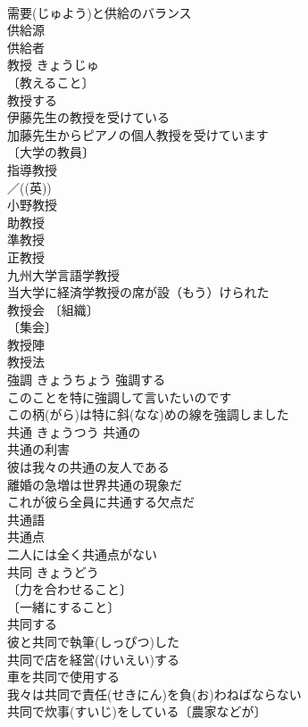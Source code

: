 \documentclass[8pt]{extreport}
\begin{document}
\begin{CJK}{UTF8}{min}
\\	需要(じゅよう)と供給のバランス 
\\	供給源 
\\	供給者 
\\	教授	きょうじゅ	
\\	〔教えること〕
\\	教授する 
\\	伊藤先生の教授を受けている 
\\	加藤先生からピアノの個人教授を受けています 
\\	〔大学の教員〕
\\	指導教授 
\\	／((英)) 
\\	小野教授 
\\	助教授 
\\	準教授 
\\	正教授 
\\	九州大学言語学教授 
\\	当大学に経済学教授の席が設（もう）けられた 
\\	教授会 〔組織〕
\\	〔集会〕
\\	教授陣 
\\	教授法 
\\	強調	きょうちょう	強調する 
\\	このことを特に強調して言いたいのです 
\\	この柄(がら)は特に斜(なな)めの線を強調しました 
\\	共通	きょうつう	共通の 
\\	共通の利害 
\\	彼は我々の共通の友人である 
\\	離婚の急増は世界共通の現象だ 
\\	これが彼ら全員に共通する欠点だ 
\\	共通語 
\\	共通点 
\\	二人には全く共通点がない 
\\	共同	きょうどう	
\\	〔力を合わせること〕
\\	〔一緒にすること〕
\\	共同する 
\\	彼と共同で執筆(しっぴつ)した 
\\	共同で店を経営(けいえい)する 
\\	車を共同で使用する 
\\	我々は共同で責任(せきにん)を負(お)わねばならない 
\\	共同で炊事(すいじ)をしている〔農家などが〕 

\end{CJK}
\end{document}
